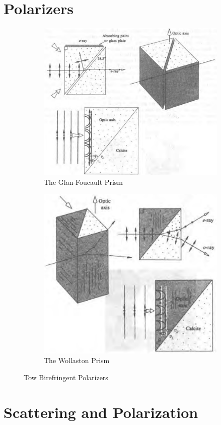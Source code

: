 \section{Polarizers}

\begin{figure}[H]
  \centering
  \begin{subfigure}{.45\textwidth}
    \centering
    \includegraphics[width=0.75\linewidth]{figures/Polarizer1}
    \caption{The Glan-Foucault Prism}
  \end{subfigure}
  \begin{subfigure}{.45\textwidth}
    \centering
    \includegraphics[width=0.75\linewidth]{figures/Polarizer2}
    \caption{The Wollaston Prism}
  \end{subfigure}
  \caption{Tow Birefringent Polarizers}
\end{figure}

\section{Scattering and Polarization}


